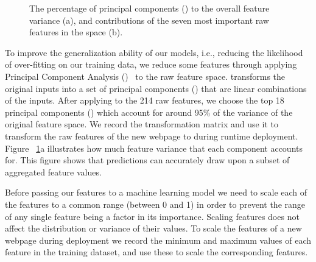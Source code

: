 \begin{figure}[!t]
	\centering
    \hfill
    \vspace{-2mm}
    \caption{The percentage of principal components (\PCs) to the overall feature variance (a), and contributions of the seven most important
     raw features in the \PCA space (b).}
    \label{fig:pca}
    \vspace{-4mm}
\end{figure}



 To improve the generalization ability of our models, i.e., reducing the likelihood of over-fitting on our training data, we reduce some features
through applying Principal Component Analysis (\PCA)~\cite{dunteman1989principal} to the raw feature
space. \PCA transforms the original inputs into a set of principal components (\PCs) that are linear combinations of the inputs. After
applying \PCA to the 214 raw features, we choose the top 18 principal components (\PCs) which account for around 95\% of the variance of
the original feature space. We record the \PCA transformation matrix and use it to transform the raw features of the new webpage to \PCs
during runtime deployment. Figure ~\ref{fig:pca}a illustrates how much feature variance that each component accounts for. This figure shows
that predictions can accurately draw upon a subset of aggregated feature values.

 Before passing our features to a machine learning model we need to scale each of the features to a
common range (between 0 and 1) in order to prevent the range of any single feature being a factor in its importance. Scaling features does
not affect the distribution or variance of their values. To scale the features of a new webpage during deployment we record the minimum and
maximum values of each feature in the training dataset, and use these to scale the corresponding features.

